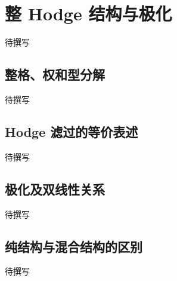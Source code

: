 
% 
% 

\section{整 Hodge 结构与极化}
\label{g4:sec:3201}

待撰写

\subsection{整格、权和型分解}
\label{g4:subsec:3201:01}
待撰写

\subsection{Hodge 滤过的等价表述}
\label{g4:subsec:3201:02}
待撰写

\subsection{极化及双线性关系}
\label{g4:subsec:3201:03}
待撰写

\subsection{纯结构与混合结构的区别}
\label{g4:subsec:3201:04}
待撰写
